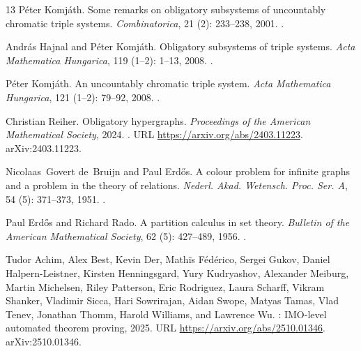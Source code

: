 \documentclass[a4paper,11pt,reqno]{amsart}
\theoremstyle{plain}
\theoremstyle{definition}
\theoremstyle{remark}
\begin{document}
\begin{thebibliography}{13}
P{\'e}ter Komj{\'a}th.
\newblock Some remarks on obligatory subsystems of uncountably chromatic triple
  systems.
\newblock \emph{Combinatorica}, 21 (2): 233--238, 2001.
\newblock {}.

Andr{\'a}s Hajnal and P{\'e}ter Komj{\'a}th.
\newblock Obligatory subsystems of triple systems.
\newblock \emph{Acta Mathematica Hungarica}, 119 (1--2):
  1--13, 2008.
\newblock {}.

P{\'e}ter Komj{\'a}th.
\newblock An uncountably chromatic triple system.
\newblock \emph{Acta Mathematica Hungarica}, 121 (1--2):
  79--92, 2008.
\newblock {}.

Christian Reiher.
\newblock Obligatory hypergraphs.
\newblock \emph{Proceedings of the American Mathematical Society}, 2024.
\newblock {}.
\newblock URL \url{https://arxiv.org/abs/2403.11223}.
\newblock arXiv:2403.11223.

Nicolaas~Govert de~Bruijn and Paul Erd{\H{o}}s.
\newblock A colour problem for infinite graphs and a problem in the theory of
  relations.
\newblock \emph{Nederl. Akad. Wetensch. Proc. Ser. A}, 54
  (5): 371--373, 1951.
\newblock {}.

Paul Erd{\H{o}}s and Richard Rado.
\newblock A partition calculus in set theory.
\newblock \emph{Bulletin of the American Mathematical Society}, 62
  (5): 427--489, 1956.
\newblock {}.

Tudor Achim, Alex Best, Kevin Der, Math{\"i}s F{\'e}d{\'e}rico, Sergei Gukov,
  Daniel Halpern-Leistner, Kirsten Henningsgard, Yury Kudryashov, Alexander
  Meiburg, Martin Michelsen, Riley Patterson, Eric Rodriguez, Laura Scharff,
  Vikram Shanker, Vladimir Sicca, Hari Sowrirajan, Aidan Swope, Matyas Tamas,
  Vlad Tenev, Jonathan Thomm, Harold Williams, and Lawrence Wu.
: {IMO}-level automated theorem proving, 2025.
\newblock URL \url{https://arxiv.org/abs/2510.01346}.
\newblock arXiv:2510.01346.

\end{thebibliography}
\end{document}
